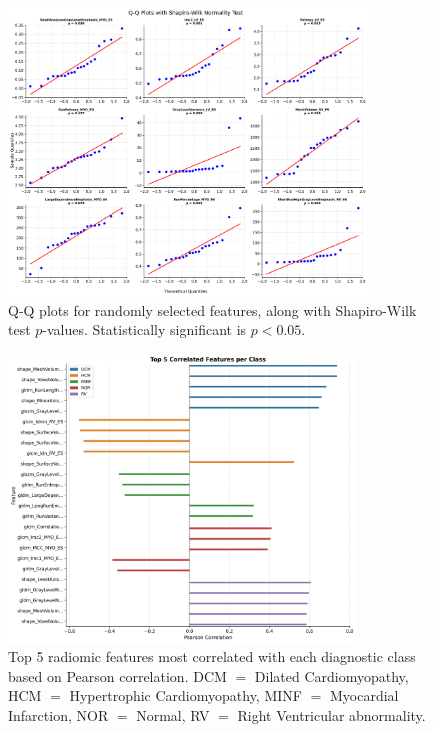 \begin{figure}
	\begin{center}
		\includegraphics[width=0.85\textwidth]{../images/eda/qq.png}
	\end{center}
	\caption{Q-Q plots for randomly selected features, along with Shapiro-Wilk
		test \( p \)-values. Statistically significant is \( p < 0.05 \).}
	\label{fig:figA3}
\end{figure}

\begin{figure}
	\begin{center}
		\includegraphics[width=0.82\textwidth]{../images/eda/ovr_correlation.png}
	\end{center}
	\caption{Top 5 radiomic features most correlated with each diagnostic class
		based on Pearson correlation. DCM $=$ Dilated Cardiomyopathy, HCM $=$
		Hypertrophic Cardiomyopathy, MINF $=$ Myocardial Infarction, NOR $=$ Normal, RV
		$=$ Right Ventricular abnormality.}
	\label{fig:figA4}
\end{figure}

